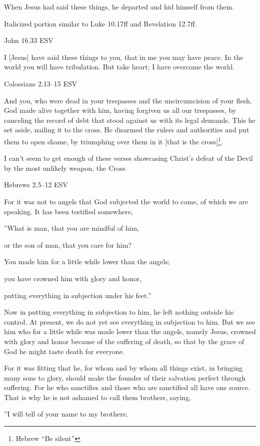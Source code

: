 \documentclass[
]{article}
\newcommand{\RL}[1]{\beginR #1\endR}
\begin{document}
When Jesus had said these things, he departed and hid himself from them.

Italicized portion similar to Luke 10.17ff and Revelation 12.7ff.

John 16.33 ESV

I {[}Jesus{]} have said these things to you, that in me you may have
peace. In the world you will have tribulation. But take heart; I have
overcome the world.

Colossians 2.13--15 ESV

And you, who were dead in your trespasses and the uncircumcision of your
flesh, God made alive together with him, having forgiven us all our
trespasses, by canceling the record of debt that stood against us with
its legal demands. This he set aside, nailing it to the cross. He
disarmed the rulers and authorities and put them to open shame, by
triumphing over them in it {[}that is the cross{]}\footnote{Hebrew ``Be
  silent''}.

I can't seem to get enough of these verses showcasing Christ's defeat of
the Devil by the most unlikely weapon, the Cross.

Hebrews 2.5--12 ESV

For it was not to angels that God subjected the world to come, of which
we are speaking. It has been testified somewhere,

\RL{''}What is man, that you are mindful of him,

or the son of man, that you care for him?

You made him for a little while lower than the angels;

you have crowned him with glory and honor,

putting everything in subjection under his feet.''

Now in putting everything in subjection to him, he left nothing outside
his control. At present, we do not yet see everything in subjection to
him. But we see him who for a little while was made lower than the
angels, namely Jesus, crowned with glory and honor because of the
suffering of death, so that by the grace of God he might taste death for
everyone.

For it was fitting that he, for whom and by whom all things exist, in
bringing many sons to glory, should make the founder of their salvation
perfect through suffering. For he who sanctifies and those who are
sanctified all have one source. That is why he is not ashamed to call
them brothers, saying,

\RL{''}I will tell of your name to my brothers;
\end{document}
